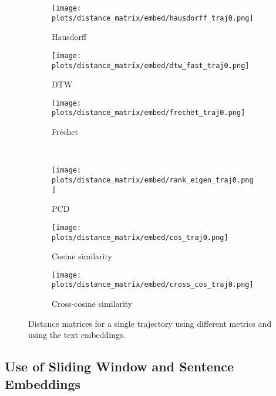 \documentclass[a4paper,12pt]{article}
\begin{document}
\begin{figure}[H]
    \centering
    \begin{subfigure}[b]{0.32\textwidth}
        \centering
        \texttt{[image: plots/distance\_matrix/embed/hausdorff\_traj0.png]}
        \caption{Hausdorff}
    \end{subfigure}
    \begin{subfigure}[b]{0.32\textwidth}
        \centering
        \texttt{[image: plots/distance\_matrix/embed/dtw\_fast\_traj0.png]}
        \caption{DTW}
    \end{subfigure}
    \begin{subfigure}[b]{0.32\textwidth}
        \centering
        \texttt{[image: plots/distance\_matrix/embed/frechet\_traj0.png]}
        \caption{Fréchet}
    \end{subfigure}
    \\[0.5em]
    \begin{subfigure}[b]{0.32\textwidth}
        \centering
        \texttt{[image: plots/distance\_matrix/embed/rank\_eigen\_traj0.png]}
        \caption{PCD}
    \end{subfigure}
    \begin{subfigure}[b]{0.32\textwidth}
        \centering
        \texttt{[image: plots/distance\_matrix/embed/cos\_traj0.png]}
        \caption{Cosine similarity}
    \end{subfigure}
    \begin{subfigure}[b]{0.32\textwidth}
        \centering
        \texttt{[image: plots/distance\_matrix/embed/cross\_cos\_traj0.png]}
        \caption{Cross-cosine similarity}
    \end{subfigure}
    \caption{Distance matrices for a single trajectory using different metrics and using the text embeddings.}
    \label{fig:distance_metrics_comparison_embed}
\end{figure}



\subsection{Use of Sliding Window and Sentence Embeddings}
\label{subsec:sliding_window}
\end{document}
